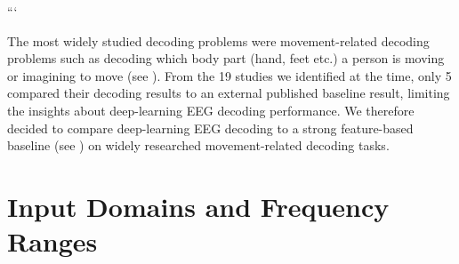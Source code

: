 \documentclass[11pt]{article}
\begin{document}
```

    The most widely studied decoding problems were movement-related decoding
problems such as decoding which body part (hand, feet etc.) a person is
moving or imagining to move (see
). From the 19 studies we
identified at the time, only 5 compared their decoding results to an
external published baseline result, limiting the insights about
deep-learning EEG decoding performance. We therefore decided to compare
deep-learning EEG decoding to a strong feature-based baseline (see
) on widely researched
movement-related decoding tasks.

    \hypertarget{input-domains-and-frequency-ranges}{%
\section{Input Domains and Frequency
Ranges}\label{input-domains-and-frequency-ranges}}
\end{document}
